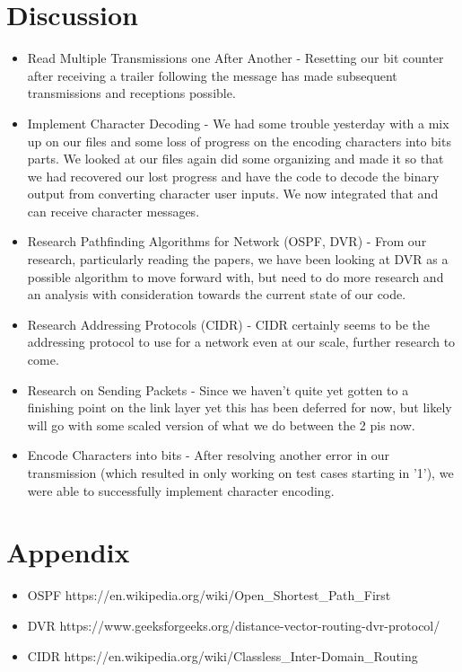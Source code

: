 \documentclass{article}
\begin{document}
\section*{Discussion}
\begin{itemize}
\item Read Multiple Transmissions one After Another - Resetting our bit counter after receiving a trailer following the message has made subsequent transmissions and receptions possible.
\item Implement Character Decoding - We had some trouble yesterday with a mix up on our files and some loss of progress on the encoding characters into bits parts. We looked at our files again did some organizing and made it so that we had recovered our lost progress and have the code to decode the binary output from converting character user inputs. We now integrated that and can receive character messages.
\item Research Pathfinding Algorithms for Network (OSPF, DVR) - From our research, particularly reading the papers, we have been looking at DVR as a possible algorithm to move forward with, but need to do more research and an analysis with consideration towards the current state of our code. 
\item Research Addressing Protocols (CIDR) - CIDR certainly seems to be the addressing protocol to use for a network even at our scale, further research to come.
\item Research on Sending Packets - Since we haven't quite yet gotten to a finishing point on the link layer yet this has been deferred for now, but likely will go with some scaled version of what we do between the 2 pis now. 
\item Encode Characters into bits - After resolving another error in our transmission (which resulted in only working on test cases starting in '1'), we were able to successfully implement character encoding. 

\end{itemize}
\section*{Appendix}
\begin{itemize}
\item OSPF https://en.wikipedia.org/wiki/Open\_Shortest\_Path\_First
\item DVR https://www.geeksforgeeks.org/distance-vector-routing-dvr-protocol/
\item CIDR https://en.wikipedia.org/wiki/Classless\_Inter-Domain\_Routing
\end{itemize}
\end{document}
